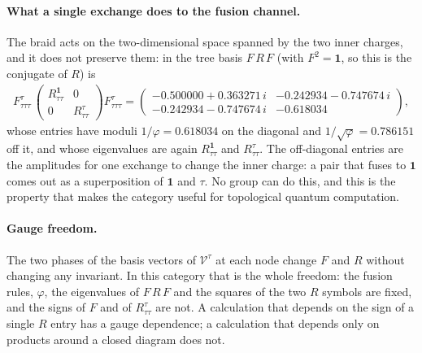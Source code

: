 \paragraph{What a single exchange does to the fusion channel.} The braid acts on the
two-dimensional space spanned by the two inner charges, and it does not preserve them:
in the tree basis $F\,R\,F$ (with $F^2=\mathbf 1$, so this is the conjugate of $R$) is
\begin{align}
F^{\tau}_{\tau\tau\tau}\,
\begin{pmatrix}R^{\mathbf 1}_{\tau\tau}&0\\ 0&R^{\tau}_{\tau\tau}\end{pmatrix}
F^{\tau}_{\tau\tau\tau}
=
\begin{pmatrix}
-0.500000+0.363271\,i & -0.242934-0.747674\,i\\
-0.242934-0.747674\,i & -0.618034
\end{pmatrix},
\end{align}
whose entries have moduli $1/\varphi=0.618034$ on the diagonal and
$1/\sqrt{\varphi}=0.786151$ off it, and whose eigenvalues are again
$R^{\mathbf 1}_{\tau\tau}$ and $R^{\tau}_{\tau\tau}$. The off-diagonal entries are the
amplitudes for one exchange to change the inner charge: a pair that fuses to $\mathbf 1$
comes out as a superposition of $\mathbf 1$ and $\tau$. No group can do this, and this
is the property that makes the category useful for topological quantum computation.

\paragraph{Gauge freedom.} The two phases of the basis vectors of $\mathscr V^\tau$ at
each node change $F$ and $R$ without changing any invariant. In this category that is
the whole freedom: the fusion rules, $\varphi$, the eigenvalues of $F\,R\,F$ and the
squares of the two $R$ symbols are fixed, and the signs of $F$ and of $R^{\tau}_{\tau\tau}$
are not. A calculation that depends on the sign of a single $R$ entry has a gauge
dependence; a calculation that depends only on products around a closed diagram does not.

